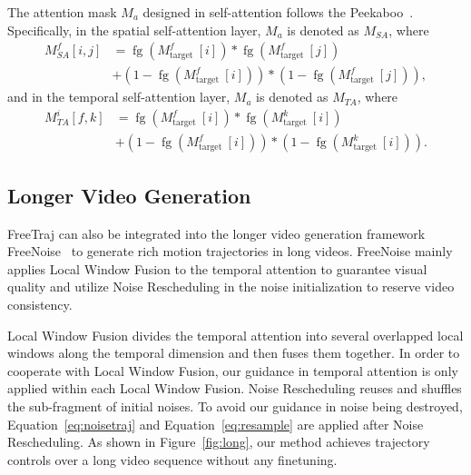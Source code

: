 The attention mask $M_a$ designed in self-attention follows the Peekaboo~\citep{jain2023peekaboo}. Specifically, in the spatial self-attention layer, $M_a$ is denoted as $M_{SA}$, where
%
\begin{equation}
\begin{aligned}
M_{S A}^f[i, j] & =\operatorname{fg}\left(M_{\text {target }}^f[i]\right) * \operatorname{fg}\left(M_{\text {target }}^f[j]\right) \\
& +\left(1-\operatorname{fg}\left(M_{\text {target }}^f[i]\right)\right) *\left(1-\operatorname{fg}\left(M_{\text {target }}^f[j]\right)\right),
\end{aligned}
\end{equation}
%
and in the temporal self-attention layer, $M_a$ is denoted as $M_{TA}$, where
\begin{equation}
\begin{aligned}
M_{T A}^i[f, k] & =\operatorname{fg}\left(M_{\text {target }}^f[i]\right) * \operatorname{fg}\left(M_{\text {target }}^k[i]\right) \\
& +\left(1-\operatorname{fg}\left(M_{\text {target }}^f[i]\right)\right) *\left(1-\operatorname{fg}\left(M_{\text {target }}^k[i]\right)\right).
\end{aligned}
\end{equation}

\subsection{Longer Video Generation}
FreeTraj can also be integrated into the longer video generation framework FreeNoise~\citep{freenoise} to generate rich motion trajectories in long videos. FreeNoise mainly applies Local Window Fusion to the temporal attention to guarantee visual quality and utilize Noise Rescheduling in the noise initialization to reserve video consistency. 

Local Window Fusion divides the temporal attention into several overlapped local windows along the temporal dimension and then fuses them together. In order to cooperate with Local Window Fusion, our guidance in temporal attention is only applied within each Local Window Fusion. Noise Rescheduling reuses and shuffles the sub-fragment of initial noises. To avoid our guidance in noise being destroyed, Equation~\ref{eq:noisetraj} and Equation~\ref{eq:resample} are applied after Noise Rescheduling. As shown in Figure~\ref{fig:long}, our method achieves trajectory controls over a long video sequence without any finetuning.
